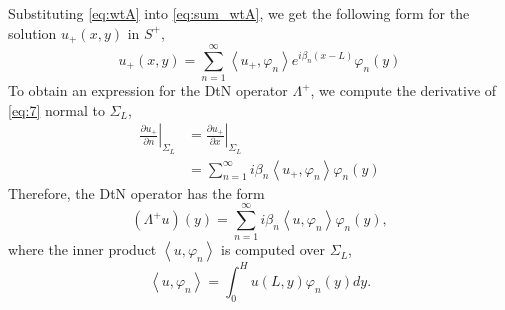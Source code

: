 \documentclass[11pt]{article}
\begin{document}
Substituting \eqref{eq:wtA} into \eqref{eq:sum_wtA}, we get the following form for the solution $u_+(x,y)$ in $S^+$,
\begin{equation}
  \label{eq:7}
  u_+(x,y) = \sum_{n=1}^\infty \left\langle u_+, \varphi_n\right\rangle e^{i \beta_n (x-L)}\varphi_n(y)  
\end{equation}
To obtain an expression for the DtN operator $\Lambda^+$, we compute the derivative of \eqref{eq:7} normal to $\Sigma_L$,
\begin{align}
  \label{eq:8}
  \left.\frac{\partial u_+}{\partial n}\right|_{\Sigma_L} &= \left.\frac{\partial u_+}{\partial x}\right|_{\Sigma_L} \\
                                  &= \sum_{n=1}^\infty i \beta_n \left\langle u_+, \varphi_n\right\rangle \varphi_n(y)
\end{align}
Therefore, the DtN operator has the form
\begin{equation}
  \label{eq:16}
  (\Lambda^+ u)(y) = \sum_{n=1}^\infty i \beta_n \left\langle u, \varphi_n\right\rangle \varphi_n(y),
\end{equation}
where the inner product $\left\langle u, \varphi_n\right\rangle$ is computed over $\Sigma_L$,
\begin{equation}
  \label{eq:17}
  \left\langle u, \varphi_n\right\rangle = \int_0^H u(L,y)\varphi_n(y) dy.
\end{equation}

\clearpage



 
\end{document}
